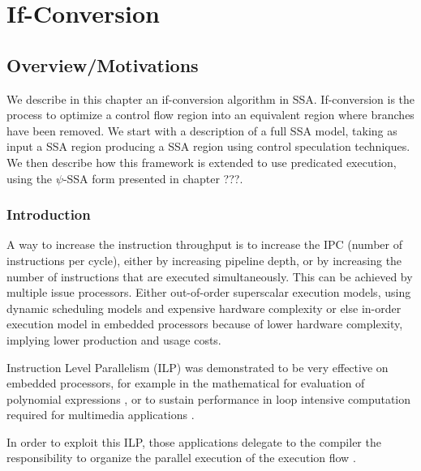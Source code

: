 \chapter{If-Conversion }\label{chap:if-conversion}
\graphicspath{{img/}{if_conversion/img/}{part4/if_conversion/img/}}
	
\newcommand\cond{~?~}


\section{Overview/Motivations}

We describe in this chapter an if-conversion algorithm in SSA. If-conversion is the process to optimize a control flow region into an equivalent region where branches have been removed. We start with a description of a full SSA model, taking as input a SSA region producing a SSA region using control speculation techniques. We then describe how this framework is extended to use predicated execution, using the $\psi$-SSA form presented in chapter ???. 

\subsection{Introduction}

A way to increase the instruction throughput is to increase the IPC (number of instructions per cycle), either by increasing pipeline depth, or by increasing the number of instructions that are executed simultaneously. This can be achieved by multiple issue processors. Either out-of-order superscalar execution models, using dynamic scheduling models and expensive hardware complexity or else in-order execution model in embedded processors because of lower hardware complexity, implying lower production and usage costs.

Instruction Level Parallelism (ILP) was demonstrated to be very effective on embedded processors, for example in the mathematical for evaluation of polynomial expressions \cite{Jeannerod:2010:TTI:1837210.1837212}, or to sustain performance in loop intensive computation required for multimedia applications \cite{FisherFaraboshiYoung}.

In order to exploit this ILP, those applications delegate to the compiler the responsibility to organize the parallel execution of the execution flow \cite{Rau:2003:IP:1074100.1074489}.

